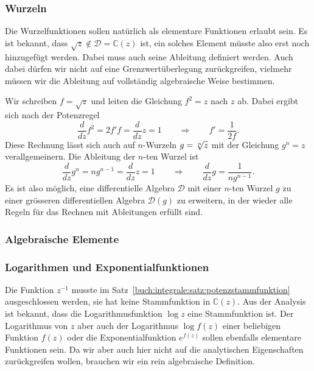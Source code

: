 \subsubsection{Wurzeln}
Die Wurzelfunktionen sollen natürlich als elementare Funktionen
erlaubt sein.
Es ist bekannt, dass $\sqrt{z}\not\in \mathscr{D}=\mathbb{C}(z)$
ist, ein solches Element müsste also erst noch hinzugefügt werden.
Dabei muss auch seine Ableitung definiert werden.
Auch dabei dürfen wir nicht auf eine Grenzwertüberlegung zurückgreifen,
vielmehr müssen wir die Ableitung auf vollständig algebraische
Weise bestimmen.

Wir schreiben $f=\sqrt{z}$ und leiten die Gleichung $f^2=z$ nach $z$ ab.
Dabei ergibt sich nach der Potenzregel
\[
\frac{d}{dz}f^2 = 2f'f = \frac{d}{dz}z=1
\qquad\Rightarrow\qquad f' = \frac{1}{2f}.
\]
Diese Rechnung lässt sich auch auf $n$-Wurzeln $g=\root{n}\of{z}$ mit
der Gleichung $g^n = z$ verallgemeinern.
Die Ableitung der $n$-ten Wurzel ist
\begin{equation}
\frac{d}{dz}g^n
=
ng^{n-1} = \frac{d}{dz}z=1
\qquad\Rightarrow\qquad
\frac{d}{dz}g = \frac{1}{ng^{n-1}}.
\end{equation}
Es ist also möglich, eine differentielle Algebra $\mathscr{D}$ mit einer
$n$-ten Wurzel $g$ zu einer grösseren differentiellen Algebra $\mathscr{D}(g)$
zu erweitern, in der wieder alle Regeln für das Rechnen mit Ableitungen
erfüllt sind.

\subsubsection{Algebraische Elemente}

\subsubsection{Logarithmen und Exponentialfunktionen}
Die Funktion $z^{-1}$ musste im
Satz~\ref{buch:integrale:satz:potenzstammfunktion}
ausgeschlossen werden, sie hat keine Stammfunktion in $\mathbb{C}(z)$.
Aus der Analysis ist bekannt, dass die Logarithmusfunktion $\log z$ 
eine Stammfunktion ist.
Der Logarithmus von $z$ aber auch der Logarithmus $\log f(z)$
einer beliebigen Funktion $f(z)$ oder die Exponentialfunktion $e^{f(z)}$
sollen ebenfalls elementare Funktionen sein.
Da wir aber auch hier nicht auf die analytischen Eigenschaften zurückgreifen
wollen, brauchen wir ein rein algebraische Definition.

